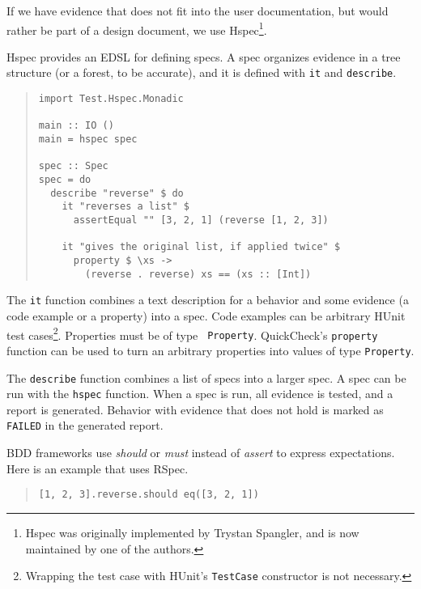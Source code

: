 \documentclass[preprint]{sigplanconf}
\begin{document}
If we have evidence that does not fit into the user documentation, but
would rather be part of a design document, we use Hspec\footnote{%
Hspec was originally implemented by Trystan Spangler, and is now
maintained by one of the authors.}.

Hspec provides an EDSL for defining specs.  A spec organizes evidence
in a tree structure (or a forest, to be accurate), and it is defined
with \texttt{it} and \texttt{describe}.

\begin{quote}
\small
\begin{verbatim}
import Test.Hspec.Monadic

main :: IO ()
main = hspec spec

spec :: Spec
spec = do
  describe "reverse" $ do
    it "reverses a list" $
      assertEqual "" [3, 2, 1] (reverse [1, 2, 3])

    it "gives the original list, if applied twice" $
      property $ \xs ->
        (reverse . reverse) xs == (xs :: [Int])
\end{verbatim}
\end{quote}

\noindent The {\tt it} function combines a text description for a
behavior and some evidence (a code example or a property) into a spec.
Code examples can be arbitrary HUnit test cases\footnote{%
Wrapping the test case with HUnit's {\tt TestCase} constructor is not
necessary.}.  Properties must be of type {\tt
Property}.  QuickCheck's \texttt{property} function can be used to turn
an arbitrary properties into values of type \texttt{Property}.

The \texttt{describe} function combines a list of specs into a larger spec.
A spec can be run with the \texttt{hspec} function.  When a spec is
run, all evidence is tested, and a report is generated.  Behavior with
evidence that does not hold is marked as {\tt FAILED} in the generated
report.

BDD frameworks use \emph{should} or \emph{must} instead of
\emph{assert} to express expectations.  Here is an example that uses
RSpec.

\begin{quote}
\small
\begin{verbatim}
[1, 2, 3].reverse.should eq([3, 2, 1])
\end{verbatim}
\end{quote}
\end{document}
